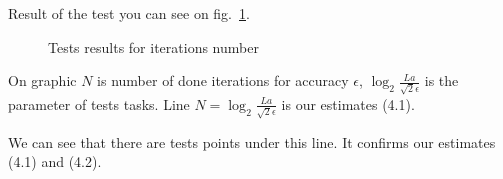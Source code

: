 \documentclass[12pt]{article}
\begin{document}
Result of the test you can see on fig.~\ref{fig:image}.

\begin{figure}[h!]
\caption{Tests results for iterations number}
\label{fig:image}
\end{figure}

On graphic $N$ is number of done iterations for accuracy $\epsilon$, $\log_2\frac{La}{\sqrt{2}\epsilon}$ is the parameter of tests tasks. Line $N = \log_2\frac{La}{\sqrt{2}\epsilon}$ is our estimates (4.1).

We can see that there are tests points under this line. It confirms our estimates (4.1) and (4.2).
\end{document}
